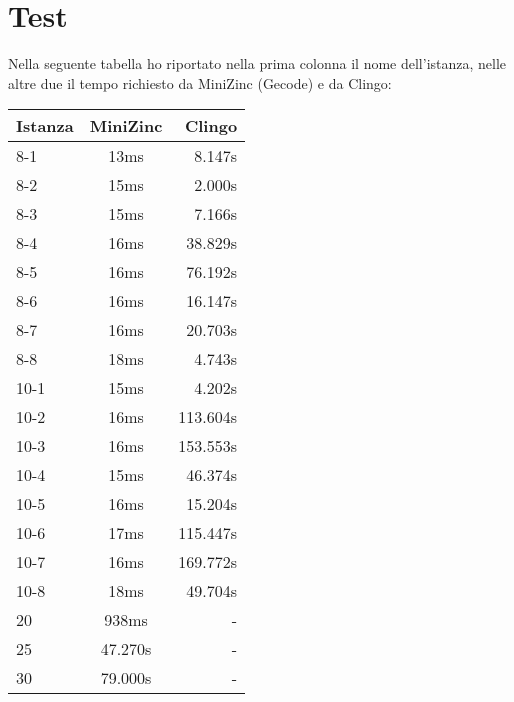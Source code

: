 \documentclass[12pt]{article}
\begin{document}
\section*{Test}
Nella seguente tabella ho riportato nella prima colonna il nome dell'istanza, nelle altre due il tempo richiesto da MiniZinc (Gecode) e da Clingo:
\let\centering\relax
\begin{center}
  \begin{tabular}{ | l | c | r | }
    \hline
    Istanza & MiniZinc & Clingo \\ \hline
    8-1 & 13ms & 8.147s \\ \hline
    8-2 & 15ms & 2.000s \\ \hline
    8-3 & 15ms & 7.166s \\ \hline
    8-4 & 16ms & 38.829s \\ \hline
    8-5 & 16ms & 76.192s \\ \hline
    8-6 & 16ms & 16.147s \\ \hline
    8-7 & 16ms & 20.703s \\ \hline
    8-8 & 18ms & 4.743s \\ \hline
    10-1 & 15ms & 4.202s \\ \hline
    10-2 & 16ms & 113.604s \\ \hline
    10-3 & 16ms & 153.553s \\ \hline
    10-4 & 15ms & 46.374s \\ \hline
    10-5 & 16ms & 15.204s \\ \hline
    10-6 & 17ms & 115.447s \\ \hline
    10-7 & 16ms & 169.772s \\ \hline
    10-8 & 18ms & 49.704s \\ \hline
    20 & 938ms & - \\ \hline
    25 & 47.270s & - \\ \hline
    30 & 79.000s & - \\
    \hline
  \end{tabular}
\end{center}
\end{document}
